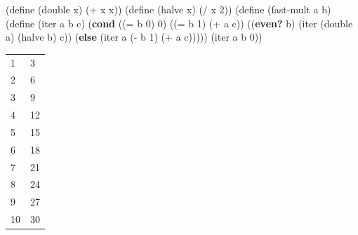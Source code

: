 \documentclass[
]{article}
\newenvironment{Shaded}{}{}
\newcommand{\DecValTok}[1]{\textcolor[rgb]{0.25,0.63,0.44}{#1}}
\newcommand{\ExtensionTok}[1]{#1}
\newcommand{\FunctionTok}[1]{\textcolor[rgb]{0.02,0.16,0.49}{#1}}
\newcommand{\KeywordTok}[1]{\textcolor[rgb]{0.00,0.44,0.13}{\textbf{#1}}}
\newcommand{\NormalTok}[1]{#1}
\newcommand{\OperatorTok}[1]{\textcolor[rgb]{0.40,0.40,0.40}{#1}}
\begin{document}
\hypertarget{fast-mult-iter}{%
\label{fast-mult-iter}}%
\begin{Shaded}
\begin{Highlighting}[numbers=left,,]
\NormalTok{(}\ExtensionTok{define}\FunctionTok{ }\NormalTok{(double x)}
\NormalTok{  (}\OperatorTok{+}\NormalTok{ x x))}
\NormalTok{(}\ExtensionTok{define}\FunctionTok{ }\NormalTok{(halve x)}
\NormalTok{  (}\OperatorTok{/}\NormalTok{ x }\DecValTok{2}\NormalTok{))}
\NormalTok{(}\ExtensionTok{define}\FunctionTok{ }\NormalTok{(fast{-}mult a b)}
\NormalTok{  (}\ExtensionTok{define}\FunctionTok{ }\NormalTok{(iter a b c)}
\NormalTok{    (}\KeywordTok{cond}\NormalTok{ ((}\OperatorTok{=}\NormalTok{ b }\DecValTok{0}\NormalTok{) }\DecValTok{0}\NormalTok{)}
\NormalTok{          ((}\OperatorTok{=}\NormalTok{ b }\DecValTok{1}\NormalTok{) (}\OperatorTok{+}\NormalTok{ a c))}
\NormalTok{          ((}\KeywordTok{even?}\NormalTok{ b)}
\NormalTok{           (iter (double a) (halve b) c))}
\NormalTok{          (}\KeywordTok{else}\NormalTok{ (iter a (}\OperatorTok{{-}}\NormalTok{ b }\DecValTok{1}\NormalTok{) (}\OperatorTok{+}\NormalTok{ a c)))))}
\NormalTok{  (iter a b }\DecValTok{0}\NormalTok{))}
\end{Highlighting}
\end{Shaded}

\begin{longtable}[]{@{}ll@{}}
\toprule
\endhead
1 & 3 \\
2 & 6 \\
3 & 9 \\
4 & 12 \\
5 & 15 \\
6 & 18 \\
7 & 21 \\
8 & 24 \\
9 & 27 \\
10 & 30 \\
\bottomrule
\end{longtable}
\end{document}
